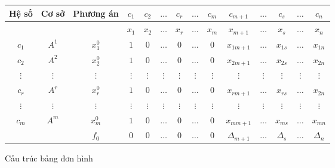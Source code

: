 \documentclass[12pt,a4paper]{report}
\begin{document}
\begin{figure}
\begin{tabular} {|c|c|c|c|c|c|c|c|c|c|c|c|c|c|}
\hline
Hệ số & Cơ sở & Phương án & $c_1$ & $c_2$ & $\hdots$ & $c_r$ & $\hdots$ & $c_m$ & $c_{m+1}$ & $\hdots$ & $c_s$ & $\hdots$ & $c_n$ \\
\hline
&&& $x_1$ & $x_2$ & $\hdots$ & $x_r$ & $\hdots$ & $x_m$ & $x_{m+1}$ & $\hdots$ & $x_s$ & $\hdots$ & $x_n$ \\
\hline
$c_1$ & $A^1$ & $x_1^0$ & $1$ & $0$ & $\hdots$ & $0$ & $\hdots$ & $0$ & $x_{1m+1}$ & $\hdots$ & $x_{1s}$ & $\hdots$ & $x_{1n}$ \\
\hline
$c_2$ & $A^2$ & $x_2^0$ & $1$ & $0$ & $\hdots$ & $0$ & $\hdots$ & $0$ & $x_{2m+1}$ & $\hdots$ & $x_{2s}$ & $\hdots$ & $x_{2n}$ \\
$\vdots$&$\vdots$&$\vdots$&$\vdots$&$\vdots$&$\vdots$&$\vdots$&$\vdots$&$\vdots$&$\vdots$&$\vdots$&$\vdots$&$\vdots$&$\vdots$ \\
$c_r$ & $A^r$ & $x_r^0$ & $1$ & $0$ & $\hdots$ & $0$ & $\hdots$ & $0$ & $x_{rm+1}$ & $\hdots$ & $x_{rs}$ & $\hdots$ & $x_{2n}$ \\
$\vdots$&$\vdots$&$\vdots$&$\vdots$&$\vdots$&$\vdots$&$\vdots$&$\vdots$&$\vdots$&$\vdots$&$\vdots$&$\vdots$&$\vdots$&$\vdots$ \\
$c_m$ & $A^m$ & $x_m^0$ & $1$ & $0$ & $\hdots$ & $0$ & $\hdots$ & $0$ & $x_{mm+1}$ & $\hdots$ & $x_{ms}$ & $\hdots$ & $x_{mn}$ \\
\hline
&& $f_0$ & $0$ & $0$ & $\hdots$ & $0$ & $\hdots$ & $0$ & $\Delta_{m+1}$ & $\hdots$ & $\Delta_s$ & $\hdots$ & $\Delta_n$ \\
\hline
\end{tabular}
\caption{Cấu trúc bảng đơn hình}
\end{figure}
\end{document}
